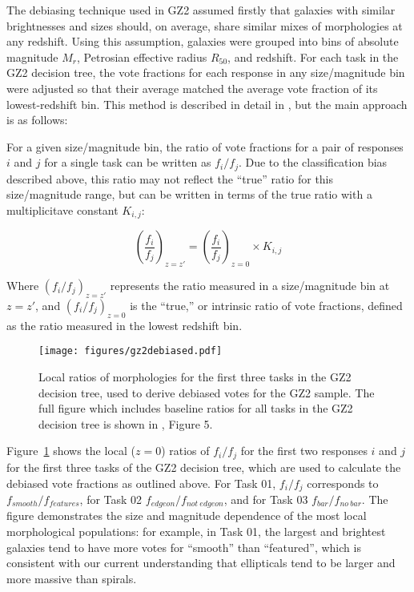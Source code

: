 The debiasing technique used in GZ2 assumed firstly that galaxies with similar brightnesses and sizes should, on average, share similar mixes of morphologies at any redshift. Using this assumption, galaxies were grouped into bins of absolute magnitude $M_r$, Petrosian effective radius $R_{50}$, and redshift. For each task in the GZ2 decision tree, the vote fractions for each response in any size/magnitude bin were adjusted so that their average matched the average vote fraction of its lowest-redshift bin. This method is described in detail in \citet{Willett2013}, but the main approach is as follows:

For a given size/magnitude bin, the ratio of vote fractions for a pair of responses $i$ and $j$ for a single task can be written as $f_i/f_j$. Due to the classification bias described above, this ratio may not reflect the ``true'' ratio for this size/magnitude range, but can be written in terms of the true ratio with a multiplicitave constant $K_{i,j}$:

\begin{equation}
\left(\frac{f_i}{f_j}\right)_{z=z'} = \left(\frac{f_i}{f_j}\right)_{z=0} \times K_{i,j}
\label{eqn:fvspk}
\end{equation}

Where $(f_i/f_j)_{z=z'}$ represents the ratio measured in a size/magnitude bin at $z=z'$, and $(f_i/f_j)_{z=0}$ is the ``true,'' or intrinsic ratio of vote fractions, defined as the ratio measured in the lowest redshift bin.

\begin{figure}
\centering
\texttt{[image: figures/gz2debiased.pdf]}
\caption{Local ratios of morphologies for the first three tasks in the GZ2 decision tree, used to derive debiased votes for the GZ2 sample. The full figure which includes baseline ratios for all tasks in the GZ2 decision tree is shown in \citet{Willett2013}, Figure 5.}
\label{fig:gz2debiased}
\end{figure} 

Figure~\ref{fig:gz2debiased} shows the local ($z=0$) ratios of $f_i/f_j$ for the first two responses $i$ and $j$ for the first three tasks of the GZ2 decision tree, which are used to calculate the debiased vote fractions as outlined above. For Task 01, $f_i/f_j$ corresponds to $f_{smooth}/f_{features}$, for Task 02 $f_{edgeon}/f_{not~edgeon}$, and for Task 03 $f_{bar}/f_{no~bar}.$ The figure demonstrates the size and magnitude dependence of the most local morphological populations: for example, in Task 01, the largest and brightest galaxies tend to have more votes for ``smooth'' than ``featured'', which is consistent with our current understanding that ellipticals tend to be larger and more massive than spirals. 


